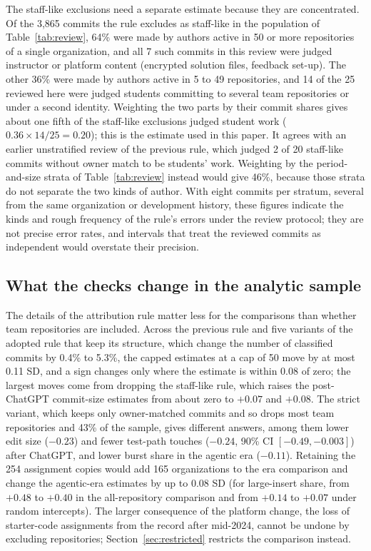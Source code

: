 \documentclass[acmsmall,screen,review,anonymous]{acmart}
\begin{document}
The staff-like exclusions need a separate estimate because they are concentrated. Of the 3,865 commits the rule excludes as staff-like in the population of Table~\ref{tab:review}, 64\% were made by authors active in 50 or more repositories of a single organization, and all 7 such commits in this review were judged instructor or platform content (encrypted solution files, feedback set-up). The other 36\% were made by authors active in 5 to 49 repositories, and 14 of the 25 reviewed here were judged students committing to several team repositories or under a second identity. Weighting the two parts by their commit shares gives about one fifth of the staff-like exclusions judged student work ($0.36 \times 14/25 = 0.20$); this is the estimate used in this paper. It agrees with an earlier unstratified review of the previous rule, which judged 2 of 20 staff-like commits without owner match to be students' work. Weighting by the period-and-size strata of Table~\ref{tab:review} instead would give 46\%, because those strata do not separate the two kinds of author. With eight commits per stratum, several from the same organization or development history, these figures indicate the kinds and rough frequency of the rule's errors under the review protocol; they are not precise error rates, and intervals that treat the reviewed commits as independent would overstate their precision.

\subsection{What the checks change in the analytic sample}
\label{sec:samplechange}

The details of the attribution rule matter less for the comparisons than whether team repositories are included. Across the previous rule and five variants of the adopted rule that keep its structure, which change the number of classified commits by 0.4\% to 5.3\%, the capped estimates at a cap of 50 move by at most 0.11 SD, and a sign changes only where the estimate is within 0.08 of zero; the largest moves come from dropping the staff-like rule, which raises the post-ChatGPT commit-size estimates from about zero to $+0.07$ and $+0.08$. The strict variant, which keeps only owner-matched commits and so drops most team repositories and 43\% of the sample, gives different answers, among them lower edit size ($-0.23$) and fewer test-path touches ($-0.24$, 90\% CI $[-0.49, -0.003]$) after ChatGPT, and lower burst share in the agentic era ($-0.11$). Retaining the 254 assignment copies would add 165 organizations to the era comparison and change the agentic-era estimates by up to 0.08 SD (for large-insert share, from $+0.48$ to $+0.40$ in the all-repository comparison and from $+0.14$ to $+0.07$ under random intercepts). The larger consequence of the platform change, the loss of starter-code assignments from the record after mid-2024, cannot be undone by excluding repositories; Section~\ref{sec:restricted} restricts the comparison instead.
\end{document}
